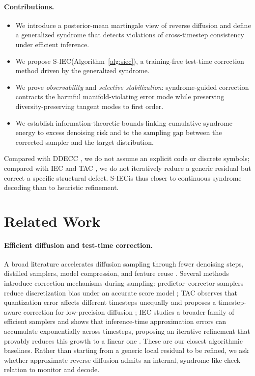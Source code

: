 \documentclass{article}
\theoremstyle{plain}
\theoremstyle{definition}
\theoremstyle{remark}
\newcommand{\SIEC}{\texorpdfstring{S\mbox{-}IEC\xspace}{S-IEC }}
\begin{document}
\paragraph{Contributions.}
\begin{itemize}[leftmargin=1.2em,itemsep=1pt,topsep=2pt]
  \item We introduce a posterior-mean martingale view of reverse diffusion and
    define a generalized syndrome that detects violations of cross-timestep
    consistency under efficient inference.
  \item We propose \SIEC (Algorithm~\ref{alg:siec}), a training-free
    test-time correction method driven by the generalized syndrome.
  \item We prove \emph{observability} and \emph{selective stabilization}:
    syndrome-guided correction contracts the harmful manifold-violating error
    mode while preserving diversity-preserving tangent modes to first order.
  \item We establish information-theoretic bounds linking cumulative syndrome
    energy to excess denoising risk and to the sampling gap between the
    corrected sampler and the target distribution.
\end{itemize}
Compared with DDECC \citep{choukroun2023ddecc}, we do not assume an explicit
code or discrete symbols; compared with IEC and TAC \citep{zhong2026iec,
yao2024tac}, we do not iteratively reduce a generic residual but correct a
specific structural defect. \SIEC is thus closer to continuous
syndrome decoding than to heuristic refinement.

\section{Related Work}
\label{sec:related_work}

\paragraph{Efficient diffusion and test-time correction.}
A broad literature accelerates diffusion sampling through fewer denoising
steps, distilled samplers, model compression, and feature reuse
\citep{salimans2022pdistill,shang2023ptqdm,ma2024deepcache,song2023consistency}.
Several methods introduce correction mechanisms during sampling:
predictor--corrector samplers reduce discretization bias under an accurate
score model \citep{song2021sde}; TAC observes that quantization error affects
different timesteps unequally and proposes a timestep-aware correction for
low-precision diffusion \citep{yao2024tac}; IEC studies a broader family of
efficient samplers and shows that inference-time approximation errors can
accumulate exponentially across timesteps, proposing an iterative refinement
that provably reduces this growth to a linear one \citep{zhong2026iec}. These
are our closest algorithmic baselines. Rather than starting from a generic
local residual to be refined, we ask whether approximate reverse diffusion
admits an internal, syndrome-like check relation to monitor and decode.
\end{document}
